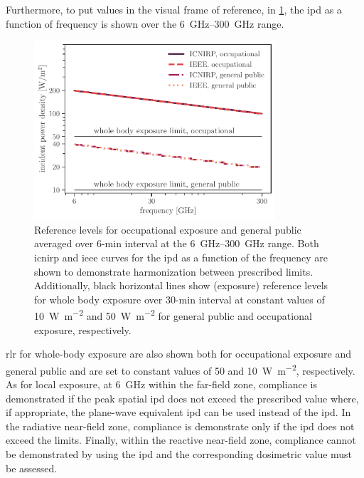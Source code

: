 Furthermore, to put values in the visual frame of reference, in \cref{fig:reference_levels}, the \gls{ipd} as a function of frequency is shown over the \SIrange[range-units=single,range-phrase=--]{6}{300}{\GHz} range.
\begin{figure}[ht]
    \centering
    \includegraphics[width=0.8\textwidth]{artwork/reference_levels.pdf}
    \caption{Reference levels for occupational exposure and general public averaged over 6-min interval at the \SIrange[range-units=single,range-phrase=--]{6}{300}{\GHz} range. Both \gls{icnirp} and \gls{ieee} curves for the \gls{ipd} as a function of the frequency are shown to demonstrate harmonization between prescribed limits. Additionally, black horizontal lines show (exposure) reference levels for whole body exposure over 30-min interval at constant values of \SI{10}{\watt\per\m\squared} and \SI{50}{\watt\per\m\squared} for general public and occupational exposure, respectively.}
    \label{fig:reference_levels}
\end{figure}
\Gls{rl}r for whole-body exposure are also shown both for occupational exposure and general public and are set to constant values of \SI{50}{} and \SI{10}{\watt\per\m\squared}, respectively.
As for local exposure, at \SI{6}{\GHz} within the far-field zone, compliance is demonstrated if the peak spatial \gls{ipd} does not exceed the prescribed value where, if appropriate, the plane-wave equivalent \gls{ipd} can be used instead of the \gls{ipd}.
In the radiative near-field zone, compliance is demonstrate only if the \gls{ipd} does not exceed the limits.
Finally, within the reactive near-field zone, compliance cannot be demonstrated by using the \gls{ipd} and the corresponding dosimetric value must be assessed.

